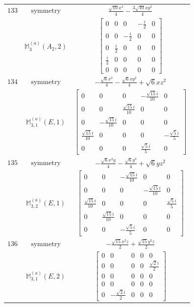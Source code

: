 \documentclass[fleqn,8pt,landscape]{jsarticle}
\begin{document}
\begin{longtable}{ccc}
$ 133 $ & $ \text{symmetry} $ & $ \frac{\sqrt{10} x^{3}}{4} - \frac{3 \sqrt{10} x y^{2}}{4} $ \\
$  $ & $ \mathbb{M}_{3}^{(a)}(A_{2},2) $ & $ \begin{bmatrix} 0 & 0 & 0 & - \frac{i}{2} & 0 \\ 0 & 0 & - \frac{i}{2} & 0 & 0 \\ 0 & \frac{i}{2} & 0 & 0 & 0 \\ \frac{i}{2} & 0 & 0 & 0 & 0 \\ 0 & 0 & 0 & 0 & 0 \end{bmatrix} $ \\ \hline
$ 134 $ & $ \text{symmetry} $ & $ - \frac{\sqrt{6} x^{3}}{4} - \frac{\sqrt{6} x y^{2}}{4} + \sqrt{6} x z^{2} $ \\
$  $ & $ \mathbb{M}_{3,1}^{(a)}(E,1) $ & $ \begin{bmatrix} 0 & 0 & 0 & - \frac{\sqrt{15} i}{10} & 0 \\ 0 & 0 & \frac{\sqrt{15} i}{10} & 0 & 0 \\ 0 & - \frac{\sqrt{15} i}{10} & 0 & 0 & 0 \\ \frac{\sqrt{15} i}{10} & 0 & 0 & 0 & - \frac{\sqrt{5} i}{5} \\ 0 & 0 & 0 & \frac{\sqrt{5} i}{5} & 0 \end{bmatrix} $ \\ \hline
$ 135 $ & $ \text{symmetry} $ & $ - \frac{\sqrt{6} x^{2} y}{4} - \frac{\sqrt{6} y^{3}}{4} + \sqrt{6} y z^{2} $ \\
$  $ & $ \mathbb{M}_{3,2}^{(a)}(E,1) $ & $ \begin{bmatrix} 0 & 0 & - \frac{\sqrt{15} i}{10} & 0 & 0 \\ 0 & 0 & 0 & - \frac{\sqrt{15} i}{10} & 0 \\ \frac{\sqrt{15} i}{10} & 0 & 0 & 0 & \frac{\sqrt{5} i}{5} \\ 0 & \frac{\sqrt{15} i}{10} & 0 & 0 & 0 \\ 0 & 0 & - \frac{\sqrt{5} i}{5} & 0 & 0 \end{bmatrix} $ \\ \hline
$ 136 $ & $ \text{symmetry} $ & $ - \frac{\sqrt{15} x^{2} z}{2} + \frac{\sqrt{15} y^{2} z}{2} $ \\
$  $ & $ \mathbb{M}_{3,1}^{(a)}(E,2) $ & $ \begin{bmatrix} 0 & 0 & 0 & 0 & 0 \\ 0 & 0 & 0 & 0 & \frac{\sqrt{2} i}{2} \\ 0 & 0 & 0 & 0 & 0 \\ 0 & 0 & 0 & 0 & 0 \\ 0 & - \frac{\sqrt{2} i}{2} & 0 & 0 & 0 \end{bmatrix} $ \\ \hline

\end{longtable}
\end{document}
